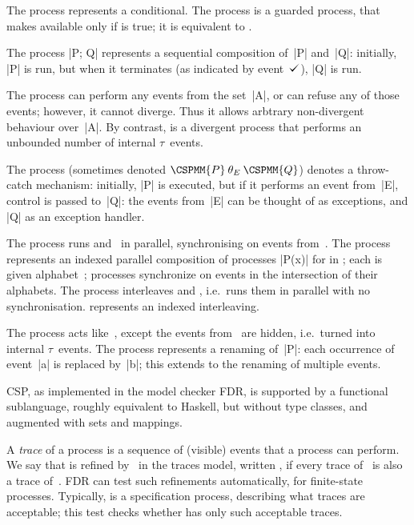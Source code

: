 The process  represents a conditional. 
The process  is a guarded process, that makes  available
only if  is true; it is equivalent to .

The process |P; Q| represents a sequential composition of~|P| and~|Q|:
initially, |P| is run, but when it terminates (as indicated by event~$\tick$),
|Q| is run. 

The process  can perform any events from the set~|A|, or can
refuse any of those events; however, it cannot diverge.  Thus it allows
arbtrary non-divergent behaviour over~|A|.  By contrast,  is a
divergent process that performs an unbounded number of internal $\tau$~events.

The process \CSPM{P [|E|> Q} 
(sometimes denoted $\CSPMM{P} \mathbin{\theta_E} \CSPMM{Q}$) denotes a
  throw-catch mechanism: initially, |P| is executed, but if it performs an
  event from~|E|, control is passed to~|Q|: the events from~|E| can be thought
  of as exceptions, and |Q| as an exception handler.

The process  runs  and~ in parallel,
synchronising on events from~.  The process  represents an indexed parallel composition of processes |P(x)| for
 in ; each  is given alphabet~;
processes synchronize on events in the intersection of their alphabets.
The process  interleaves  and , i.e.\ runs them
in parallel with no synchronisation.   represents an
indexed interleaving.

The process  acts like~, except the events from~
are hidden, i.e.~turned into internal $\tau$~events.  
%
The process  represents a renaming of~|P|: each occurrence of
event~|a| is replaced by~|b|; this extends to the renaming of multiple
events. 

CSP, as implemented in the model checker FDR, is supported by a functional
sublanguage, roughly equivalent to Haskell, but without type classes, and
augmented with sets and mappings. 
 
A \emph{trace} of a process is a sequence of (visible) events that a process
can perform.  We say that  is refined by~ in the traces model,
written \CSPM{P [T= Q}, if every trace of~ is also a trace
of~\@.  FDR can test such refinements automatically, for finite-state
processes.  Typically,  is a specification process, describing what
traces are acceptable; this test checks whether  has only such
acceptable traces.  

